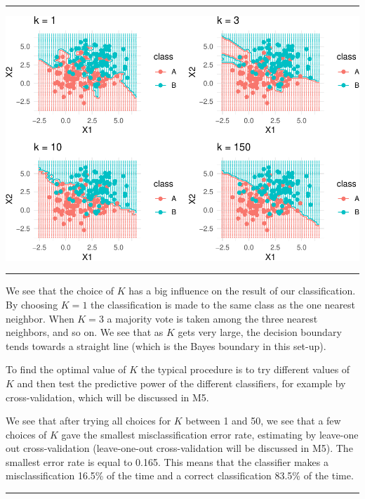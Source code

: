 \documentclass[]{article}
\begin{document}
\begin{center}\rule{0.5\linewidth}{\linethickness}\end{center}

\includegraphics{2StatLearn_files/figure-latex/unnamed-chunk-4-1.pdf}

\begin{center}\rule{0.5\linewidth}{\linethickness}\end{center}

We see that the choice of \(K\) has a big influence on the result of our
classification. By choosing \(K=1\) the classification is made to the
same class as the one nearest neighbor. When \(K=3\) a majority vote is
taken among the three nearest neighbors, and so on. We see that as \(K\)
gets very large, the decision boundary tends towards a straight line
(which is the Bayes boundary in this set-up).

To find the optimal value of \(K\) the typical procedure is to try
different values of \(K\) and then test the predictive power of the
different classifiers, for example by cross-validation, which will be
discussed in M5.

We see that after trying all choices for \(K\) between 1 and 50, we see
that a few choices of \(K\) gave the smallest misclassification error
rate, estimating by leave-one out cross-validation (leave-one-out
cross-validation will be discussed in M5). The smallest error rate is
equal to 0.165. This means that the classifier makes a misclassification
16.5\% of the time and a correct classification 83.5\% of the time.

\begin{center}\rule{0.5\linewidth}{\linethickness}\end{center}
\end{document}
